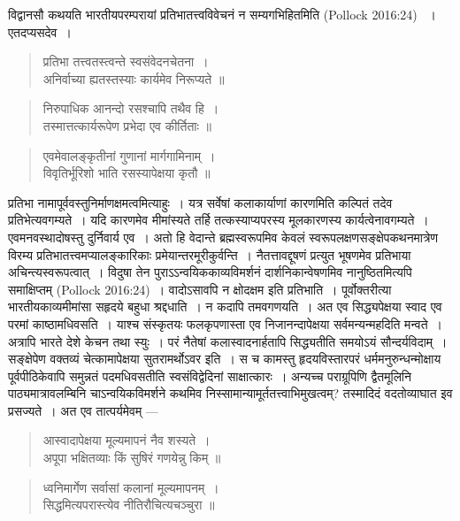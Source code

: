 {\dev विद्वानसौ कथयति भारतीयपरम्परायां प्रतिभातत्त्वविवेचनं न सम्यगभिहितमिति} (Pollock 2016:24) {\dev~। एतदप्यसदेव~।}
\begin{quote}
{\dev प्रतिभा तत्त्वतस्त्वन्ते स्वसंवेदनचेतना~।}\\
{\dev अनिर्वाच्या ह्यतस्तस्याः कार्यमेव निरूप्यते ॥}
\end{quote}
\begin{quote}
{\dev निरुपाधिक आनन्दो रसश्चापि तथैव हि~।}\\
{\dev तस्मात्तत्कार्यरूपेण प्रभेदा एव कीर्तिताः ॥}
\end{quote}
\begin{quote}
{\dev एवमेवालङ्कृतीनां गुणानां मार्गगामिनाम्~।}\\
{\dev विवृतिर्भूरिशो भाति रसस्यापेक्षया कृतौ ॥}
\end{quote}

{\dev प्रतिभा नामापूर्ववस्तुनिर्माणक्षमत्वमित्याहुः~। यत्र सर्वेषां कलाकार्याणां कारणमिति कल्पितं तदेव प्रतिभेत्यवगम्यते~। यदि कारणमेव मीमांस्यते तर्हि तत्कस्याप्यपरस्य मूलकारणस्य कार्यत्वेनावगम्यते~। एवमनवस्थादोषस्तु दुर्निवार्य एव~। अतो हि वेदान्ते ब्रह्मस्वरूपमिव केवलं स्वरूपलक्षणसङ्क्षेपकथनमात्रेण विरम्य प्रतिभातत्त्वमप्यालङ्कारिकाः प्रमेयान्तरमूरी\-कुर्वन्ति~। नैतत्तावद्दूषणं प्रत्युत भूषणमेव प्रतिभाया अचिन्त्यस्वरूपत्वात्~। विदुषा तेन पुराऽऽन्वयिककाव्यविमर्शनं दार्शनिकान्वेषणमिव नानुष्ठितमित्यपि समाक्षिप्तम्} (Pollock 2016:24){\dev~। वादोऽसावपि न क्षोदक्षम इति प्रतिभाति~। पूर्वोक्तरीत्या भारतीयकाव्यमीमांसा सहृदये बहुधा श्रद्दधाति~। न कदापि तमवगणयति~। अत एव सिद्ध्यपेक्षया स्वाद एव परमां काष्ठामधिवसति~। याश्च संस्कृतयः फलकृपणास्ता एव निजानन्दापेक्षया सर्वमन्यन्महदिति मन्वते~। अत्रापि भारते देशे केचन तथा स्युः~। परं नैतेषां कलास्वादनार्हतापि सिद्ध्यतीति समयोऽयं सौन्दर्यविदाम्~। सङ्क्षेपेण वक्तव्यं चेत्कामापेक्षया सुतरामर्थोऽवर इति~। स च कामस्तु हृदयविस्तारपरं धर्ममनुरुन्धन्मोक्षाय पूर्वपीठिकेवापि समुन्नतं पदमधिवसतीति स्वसंविद्वेदिनां साक्षात्कारः~। अन्यच्च पराग्रूपिणि द्वैतमूलिनि पाठ्यमात्रावलम्बिनि चाऽन्वयिकविमर्शने कथमिव निस्सामान्यामूर्ततत्त्वाभिमुखत्वम्? तस्मादिदं वदतोव्याघात इव प्रसज्यते~। अत एव तात्पर्यमेवम् ---}   
\begin{quote}
{\dev आस्वादापेक्षया मूल्यमापनं नैव शस्यते~।}\\
{\dev अपूपा भक्षितव्याः किं सुषिरं गणयेन्नु किम् ॥}
\end{quote}
\begin{quote}
{\dev ध्वनिमार्गेण सर्वासां कलानां मूल्यमापनम्~।}\\
{\dev सिद्धमित्यपरास्त्येव नीतिरौचित्यचञ्चुरा ॥}
\end{quote}

